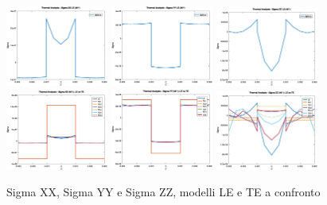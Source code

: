 \documentclass{article}
\begin{document}
            \begin{figure}[h!]
                \centering
                 \label{fig:sigmas_thermal_45}
                \includegraphics[width=0.3\textwidth]{MUL2/Esercitazione3/MUL2_FEM/OUTPUT/PLOT/thermal_XX_LE_45.svg.eps}
                \includegraphics[width=0.3\textwidth]{MUL2/Esercitazione3/MUL2_FEM/OUTPUT/PLOT/thermal_YY_LE_45.svg.eps}
                \includegraphics[width=0.3\textwidth]{MUL2/Esercitazione3/MUL2_FEM/OUTPUT/PLOT/thermal_ZZ_LE_45.svg.eps}
                \includegraphics[width=0.3\textwidth]{MUL2/Esercitazione3/MUL2_FEM/OUTPUT/PLOT/thermal_XX_LEvsTE_45.svg.eps}
                \includegraphics[width=0.3\textwidth]{MUL2/Esercitazione3/MUL2_FEM/OUTPUT/PLOT/thermal_YY_LEvsTE_45.svg.eps}
                \includegraphics[width=0.3\textwidth]{MUL2/Esercitazione3/MUL2_FEM/OUTPUT/PLOT/thermal_ZZ_LEvsTE_45.svg.eps}
                \caption{Sigma XX, Sigma YY e Sigma ZZ, modelli LE e TE a confronto}
            \end{figure}
\end{document}
